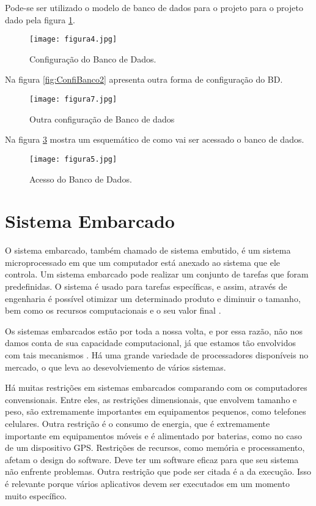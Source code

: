 Pode-se ser utilizado o modelo de banco de dados para o projeto para o projeto dado pela figura \ref{fig:ConfiBanco}.

\begin{figure}[!h]
	\centering
	\caption{Configuração do Banco de Dados.}
	\texttt{[image: figura4.jpg]}
	\label{fig:ConfiBanco}
\end{figure}

Na figura \ref{fig:ConfiBanco2} apresenta outra forma de configuração do BD.

\begin{figure}[!h]
	\centering
	\caption{Outra configuração de Banco de dados}
	\texttt{[image: figura7.jpg]}
	\label{fig:ConfigBanco2}
\end{figure}


Na figura \ref{fig:BancoAcess} mostra um esquemático de como vai ser acessado o banco de dados.

\begin{figure}[!h]
	\centering
	\caption{Acesso do Banco de Dados.}
	\texttt{[image: figura5.jpg]}
	\label{fig:BancoAcess}
\end{figure}


\section[Sistema Embarcado]{Sistema Embarcado}

O sistema embarcado, também chamado de sistema embutido, é um sistema microprocessado em que um computador está anexado ao sistema que ele controla. Um sistema embarcado pode realizar um conjunto de tarefas que foram predefinidas. O sistema é usado para tarefas específicas, e assim, através de engenharia é possível otimizar um determinado produto e diminuir o tamanho, bem como os recursos computacionais e o seu valor final \cite{embarcado}.

Os sistemas embarcados estão por toda a nossa volta, e por essa razão, não nos damos conta de sua capacidade computacional, já que estamos tão envolvidos com tais mecanismos \cite{embarcado}. Há uma grande variedade de processadores disponíveis no mercado, o que leva ao desevolviemento de vários sistemas.

Há muitas restrições em sistemas embarcados comparando com os computadores convensionais. Entre eles, as restrições dimensionais, que envolvem tamanho e peso, são extremamente importantes em equipamentos pequenos, como telefones celulares. Outra restrição é o consumo de energia, que é extremamente importante em equipamentos móveis e é alimentado por baterias, como no caso de um dispositivo GPS. Restrições de recursos, como memória e processamento, afetam o design do software. Deve ter um software eficaz para que seu sistema não enfrente problemas. Outra restrição que pode ser citada é a da execução. Isso é relevante porque vários aplicativos devem ser executados em um momento muito específico.

